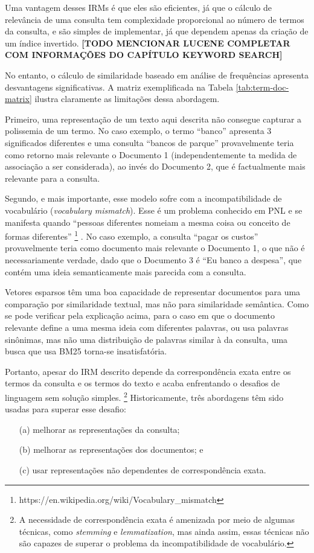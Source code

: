 \documentclass[
	12pt,				%
	openright,			%
	oneside,			%
	a4paper,			%
	english,			%
	french,				%
	spanish,			%
	brazil				%
	]{abntex2}
\begin{document}
Uma vantagem desses IRMs é que eles são eficientes, já que o cálculo de relevância de uma consulta tem complexidade proporcional ao número de termos da consulta, e são simples de implementar, já que dependem
apenas da criação de um índice invertido.
\textbf{[TODO MENCIONAR LUCENE COMPLETAR COM INFORMAÇÕES DO CAPÍTULO KEYWORD SEARCH]}

No entanto, o cálculo de similaridade baseado em análise de frequências apresenta desvantagens significativas. A matriz exemplificada na Tabela \ref{tab:term-doc-matrix} ilustra claramente as limitações dessa abordagem.

Primeiro, uma representação de um texto aqui descrita não consegue capturar a polissemia de um termo.
No caso exemplo, o termo ``banco'' apresenta 3 significados diferentes e uma consulta ``bancos de parque''
provavelmente teria como retorno mais relevante o Documento 1 (independentemente ta medida de associação a ser considerada),
ao invés do Documento 2, que é factualmente mais relevante para a consulta.

Segundo, e mais importante, esse modelo sofre com a incompatibilidade de vocabulário (\textit{vocabulary mismatch}).
Esse é um problema conhecido em PNL e se manifesta quando ``pessoas diferentes nomeiam a mesma coisa ou conceito de formas diferentes''
\footnote{https://en.wikipedia.org/wiki/Vocabulary_mismatch}
.
No caso exemplo, a consulta ``pagar os custos'' provavelmente teria como documento mais relevante o Documento 1, o que não é necessariamente verdade,
dado que o Documento 3 é ``Eu banco a despesa'', que contém uma ideia semanticamente mais parecida com a consulta.

Vetores esparsos têm uma boa capacidade de representar documentos para uma comparação por similaridade textual, mas não para similaridade semântica.
Como se pode verificar pela explicação acima, para o caso em que o documento relevante define a uma mesma ideia com diferentes palavras, ou usa palavras sinônimas, mas não uma distribuição de palavras similar à da consulta, uma busca que usa BM25 torna-se insatisfatória. \cite{thakur-2021-BEIR}

Portanto, apesar do IRM descrito depende da correspondência exata entre os termos da consulta e os termos do texto e acaba enfrentando o desafios de linguagem sem solução simples.
\footnote{A necessidade de correspondência exata é amenizada por meio de algumas técnicas, como \textit{stemming} e \textit{lemmatization}, mas
ainda assim, essas técnicas não são capazes de superar o problema da incompatibilidade de vocabulário.}
Historicamente, três abordagens têm sido usadas para superar esse desafio:
\begin{itemize}
    \item[(a)] melhorar as representações da consulta;
    \item[(b)] melhorar as representações dos documentos; e
    \item[(c)] usar representações não dependentes de correspondência exata.
\end{itemize}
\cite{}
\end{document}
